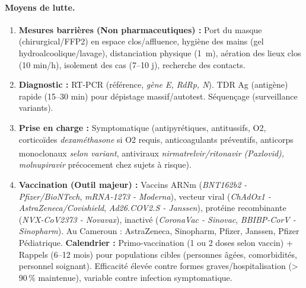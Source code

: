 \documentclass[11pt]{article}
\begin{document}
\paragraph{Moyens de lutte.}
\begin{enumerate}
    \item \textbf{Mesures barrières (Non pharmaceutiques) :} Port du masque (chirurgical/FFP2) en espace clos/affluence, hygiène des mains (gel hydroalcoolique/lavage), distanciation physique (\SI{1}{\meter}), aération des lieux clos (10 min/h), isolement des cas (7--10 j), recherche des contacts.
    \item \textbf{Diagnostic :} RT-PCR (référence, \emph{gène E, RdRp, N}). TDR Ag (antigène) rapide (15--30 min) pour dépistage massif/autotest. Séquençage (surveillance variants).
    \item \textbf{Prise en charge :} Symptomatique (antipyrétiques, antitussifs, O2, corticoïdes \emph{dexaméthasone} si O2 requis, anticoagulants préventifs, anticorps monoclonaux \emph{selon variant}, antiviraux \emph{nirmatrelvir/ritonavir (Paxlovid\textsuperscript{\textregistered}), molnupiravir} précocement chez sujets à risque).
    \item \textbf{Vaccination (Outil majeur) :} Vaccins ARNm (\emph{BNT162b2 - Pfizer/BioNTech}, \emph{mRNA-1273 - Moderna}), vecteur viral (\emph{ChAdOx1 - AstraZeneca/Covishield}, \emph{Ad26.COV2.S - Janssen}), protéine recombinante (\emph{NVX-CoV2373 - Novavax}), inactivé (\emph{CoronaVac - Sinovac}, \emph{BBIBP-CorV - Sinopharm}). Au Cameroun : AstraZeneca, Sinopharm, Pfizer, Janssen, Pfizer Pédiatrique. \textbf{Calendrier :} Primo-vaccination (1 ou 2 doses selon vaccin) + Rappels (6--12 mois) pour populations cibles (personnes âgées, comorbidités, personnel soignant). Efficacité élevée contre formes graves/hospitalisation (> 90\,\% maintenue), variable contre infection symptomatique.
\end{enumerate}
\end{document}

